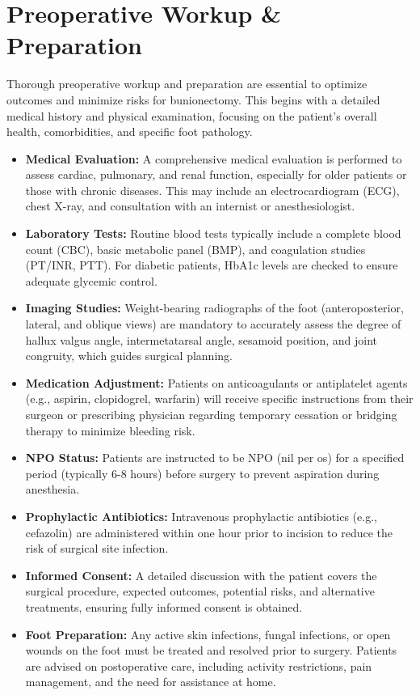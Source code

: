 \section*{Preoperative Workup \& Preparation}
Thorough preoperative workup and preparation are essential to optimize outcomes and minimize risks for bunionectomy. This begins with a detailed medical history and physical examination, focusing on the patient's overall health, comorbidities, and specific foot pathology.

\begin{itemize}
  \item \textbf{Medical Evaluation:} A comprehensive medical evaluation is performed to assess cardiac, pulmonary, and renal function, especially for older patients or those with chronic diseases. This may include an electrocardiogram (ECG), chest X-ray, and consultation with an internist or anesthesiologist.
  \item \textbf{Laboratory Tests:} Routine blood tests typically include a complete blood count (CBC), basic metabolic panel (BMP), and coagulation studies (PT/INR, PTT). For diabetic patients, HbA1c levels are checked to ensure adequate glycemic control.
  \item \textbf{Imaging Studies:} Weight-bearing radiographs of the foot (anteroposterior, lateral, and oblique views) are mandatory to accurately assess the degree of hallux valgus angle, intermetatarsal angle, sesamoid position, and joint congruity, which guides surgical planning.
  \item \textbf{Medication Adjustment:} Patients on anticoagulants or antiplatelet agents (e.g., aspirin, clopidogrel, warfarin) will receive specific instructions from their surgeon or prescribing physician regarding temporary cessation or bridging therapy to minimize bleeding risk.
  \item \textbf{NPO Status:} Patients are instructed to be NPO (nil per os) for a specified period (typically 6-8 hours) before surgery to prevent aspiration during anesthesia.
  \item \textbf{Prophylactic Antibiotics:} Intravenous prophylactic antibiotics (e.g., cefazolin) are administered within one hour prior to incision to reduce the risk of surgical site infection.
  \item \textbf{Informed Consent:} A detailed discussion with the patient covers the surgical procedure, expected outcomes, potential risks, and alternative treatments, ensuring fully informed consent is obtained.
  \item \textbf{Foot Preparation:} Any active skin infections, fungal infections, or open wounds on the foot must be treated and resolved prior to surgery. Patients are advised on postoperative care, including activity restrictions, pain management, and the need for assistance at home.
\end{itemize}

